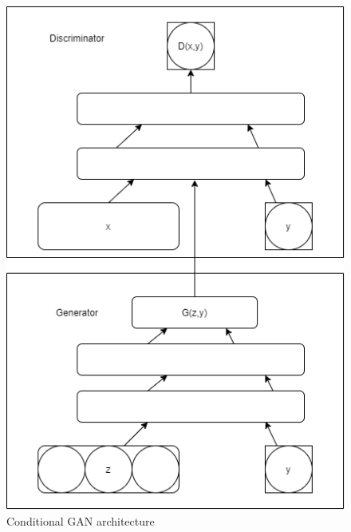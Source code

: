 \documentclass[conference]{IEEEtran}
\begin{document}
\begin{figure}[htbp]
\centerline{\includegraphics[scale=0.5]{cGAN architecture.png}}
\caption{Conditional GAN architecture}
\label{fig}
\end{figure}
\end{document}
